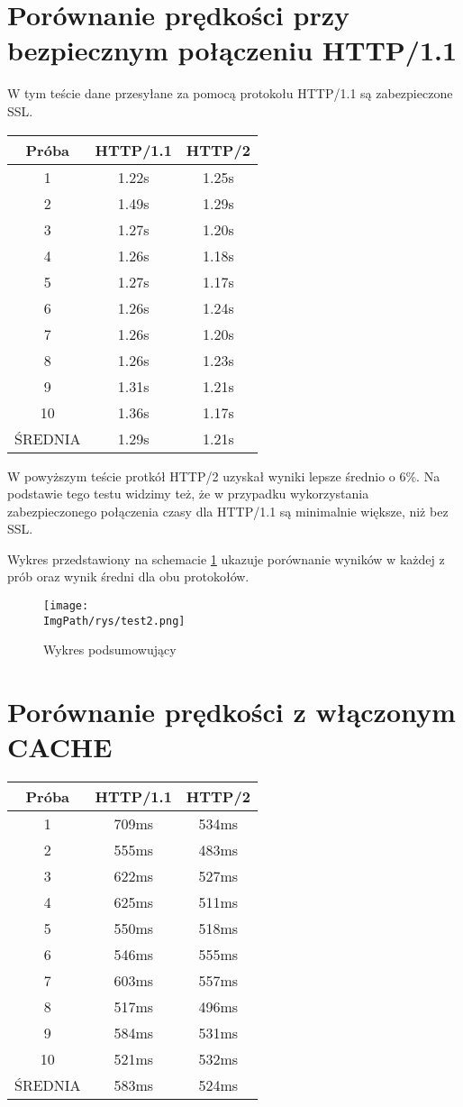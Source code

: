 \documentclass[a4paper,12pt,twoside,openany]{report}
\newcommand{\ImgPath}{.}
\begin{document}
\section{Porównanie prędkości przy bezpiecznym połączeniu HTTP/1.1}

W tym teście dane przesyłane za pomocą protokołu HTTP/1.1 są zabezpieczone SSL.

\begin{tabular}{c|c|c}
Próba & HTTP/1.1 & HTTP/2 \\ \hline
1 & 1.22s & 1.25s \\
2 & 1.49s & 1.29s \\
3 & 1.27s & 1.20s \\
4 & 1.26s & 1.18s \\
5 & 1.27s & 1.17s \\
6 & 1.26s & 1.24s \\
7 & 1.26s & 1.20s \\
8 & 1.26s & 1.23s \\
9 & 1.31s & 1.21s \\
10 & 1.36s & 1.17s\\ \hline
ŚREDNIA & 1.29s & 1.21s \\
\end{tabular}

W powyższym teście protkół HTTP/2 uzyskał wyniki lepsze średnio o 6\%.
Na podstawie tego testu widzimy też, że w przypadku wykorzystania zabezpieczonego połączenia czasy dla HTTP/1.1 są minimalnie większe, niż bez SSL.

Wykres przedstawiony na schemacie \ref{schematTest2} ukazuje porównanie wyników w każdej z prób oraz wynik średni dla obu protokołów.

\begin{figure}[!htbp]
	\begin{center}
\centering
\texttt{[image: \\ImgPath/rys/test2.png]}
\end{center}
	\caption{Wykres podsumowujący}
	\label{schematTest2}
\end{figure}

\section{Porównanie prędkości z włączonym CACHE}

\begin{tabular}{c|c|c}
Próba & HTTP/1.1 & HTTP/2 \\ \hline
1 & 709ms & 534ms \\
2 & 555ms & 483ms \\
3 & 622ms & 527ms \\
4 & 625ms & 511ms \\
5 & 550ms & 518ms \\
6 & 546ms & 555ms \\
7 & 603ms & 557ms \\
8 & 517ms & 496ms \\
9 & 584ms & 531ms \\
10 & 521ms & 532ms \\ \hline
ŚREDNIA & 583ms & 524ms \\
\end{tabular}
\end{document}

